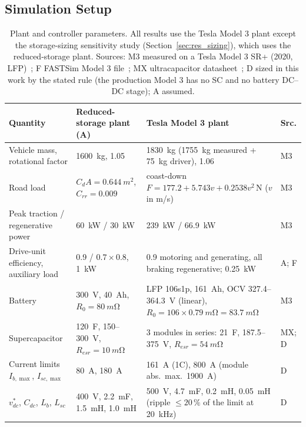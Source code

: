 \subsection{Simulation Setup}\label{sec:setup}



\begin{table}[t]
\centering\footnotesize\setlength{\tabcolsep}{4pt}
\caption{Plant and controller parameters. All results use the Tesla Model 3 plant except the storage-sizing sensitivity study (Section~\ref{sec:res_sizing}), which uses the reduced-storage plant. Sources: M3 measured on a Tesla Model 3 SR+ (2020, LFP)~\cite{rosenberger2024m3}; F FASTSim Model 3 file~\cite{fastsimrepo}; MX ultracapacitor datasheet~\cite{maxwell125v}; D sized in this work by the stated rule (the production Model 3 has no SC and no battery DC--DC stage); A assumed.}
\label{tab:params}
\begin{tabular}{@{}p{}p{}p{}l@{}}
\toprule
Quantity & Reduced-storage plant (A) & Tesla Model 3 plant & Src.\\\midrule
Vehicle mass, rotational factor & \SI{1600}{kg}, 1.05 & \SI{1830}{kg} (\SI{1755}{kg} measured + \SI{75}{kg} driver), 1.06 & M3\\
Road load & $C_dA=\SI{0.644}{m^2}$, $C_{rr}=0.009$ & coast-down $F=177.2+5.743v+0.2538v^2$\,N ($v$ in m/s) & M3\\
Peak traction / regenerative power & \SI{60}{kW} / \SI{30}{kW} & \SI{239}{kW} / \SI{66.9}{kW} & M3\\
Drive-unit efficiency, auxiliary load & 0.9 / $0.7\times0.8$, \SI{1}{kW} & 0.9 motoring and generating, all braking regenerative; \SI{0.25}{kW} & A; F\\
Battery & \SI{300}{V}, \SI{40}{Ah}, $R_0=\SI{80}{m\ohm}$ & LFP 106s1p, \SI{161}{Ah}, OCV 327.4--\SI{364.3}{V} (linear), $R_0=106\times\SI{0.79}{m\ohm}=\SI{83.7}{m\ohm}$ & M3\\
Supercapacitor & \SI{120}{F}, 150--\SI{300}{V}, $R_{esr}=\SI{10}{m\ohm}$ & 3 modules in series: \SI{21}{F}, 187.5--\SI{375}{V}, $R_{esr}=\SI{54}{m\ohm}$ & MX; D\\
Current limits $I_{b,\max}$, $I_{sc,\max}$ & \SI{80}{A}, \SI{180}{A} & \SI{161}{A} (1C), \SI{800}{A} (module abs.\ max.\ \SI{1900}{A}) & D\\
$v^*_{dc}$, $C_{dc}$, $L_b$, $L_{sc}$ & \SI{400}{V}, \SI{2.2}{mF}, \SI{1.5}{mH}, \SI{1.0}{mH} & \SI{500}{V}, \SI{4.7}{mF}, \SI{0.2}{mH}, \SI{0.05}{mH} (ripple $\le20\,\%$ of the limit at \SI{20}{kHz}) & D\\

\end{tabular}
\end{table}
